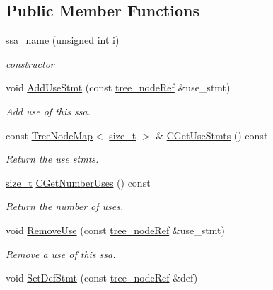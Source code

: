 \subsection*{Public Member Functions}
\begin{DoxyCompactItemize}
\item 
\hyperlink{structssa__name_a766cc91d933752474fef9c82c937a154}{ssa\+\_\+name} (unsigned int i)
\begin{DoxyCompactList}\small\item\em constructor \end{DoxyCompactList}\item 
void \hyperlink{structssa__name_a69e17d397eba584f53986d9930ca299d}{Add\+Use\+Stmt} (const \hyperlink{tree__node_8hpp_a6ee377554d1c4871ad66a337eaa67fd5}{tree\+\_\+node\+Ref} \&use\+\_\+stmt)
\begin{DoxyCompactList}\small\item\em Add use of this ssa. \end{DoxyCompactList}\item 
const \hyperlink{classTreeNodeMap}{Tree\+Node\+Map}$<$ \hyperlink{tutorial__fpt__2017_2intro_2sixth_2test_8c_a7c94ea6f8948649f8d181ae55911eeaf}{size\+\_\+t} $>$ \& \hyperlink{structssa__name_acdb4743f93ac497cce42a54359785b00}{C\+Get\+Use\+Stmts} () const
\begin{DoxyCompactList}\small\item\em Return the use stmts. \end{DoxyCompactList}\item 
\hyperlink{tutorial__fpt__2017_2intro_2sixth_2test_8c_a7c94ea6f8948649f8d181ae55911eeaf}{size\+\_\+t} \hyperlink{structssa__name_ac3fa81e7dc097efbbcd404224f8309cd}{C\+Get\+Number\+Uses} () const
\begin{DoxyCompactList}\small\item\em Return the number of uses. \end{DoxyCompactList}\item 
void \hyperlink{structssa__name_a7868a4cb68f715b32df67f1217865470}{Remove\+Use} (const \hyperlink{tree__node_8hpp_a6ee377554d1c4871ad66a337eaa67fd5}{tree\+\_\+node\+Ref} \&use\+\_\+stmt)
\begin{DoxyCompactList}\small\item\em Remove a use of this ssa. \end{DoxyCompactList}\item 
void \hyperlink{structssa__name_a62b25db42763bfdd380ff6a87a02c7ad}{Set\+Def\+Stmt} (const \hyperlink{tree__node_8hpp_a6ee377554d1c4871ad66a337eaa67fd5}{tree\+\_\+node\+Ref} \&def)

\end{DoxyCompactItemize}
